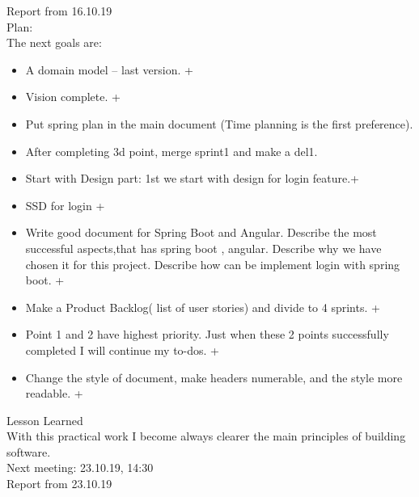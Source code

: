 \documentclass{scrartcl}
\begin{document}
Report from 16.10.19\\
Plan:\\
The next goals are:\\
\begin{itemize}


	\item	A domain model – last version. +
	\item	Vision complete. +
	\item	Put spring plan in the main document (Time planning is the first preference).
	\item	After completing 3d point, merge sprint1 and make a del1.
	\item	Start with Design part: 1st we start with design for login feature.+
	\item	SSD for login +
	\item	Write good document for Spring Boot and Angular. Describe the most successful aspects,that has spring boot , angular. Describe why we have chosen it for this project. Describe how can be implement login with spring boot.    +
	\item	Make a Product Backlog( list of user stories) and divide to 4 sprints. +
	\item	Point 1 and 2 have highest priority. Just when these 2 points successfully completed I will continue my  to-dos.  +
	\item	Change the style of document, make headers numerable, and the style more readable.  +
 \end{itemize}
Lesson Learned\\
With this practical work I become always clearer the main principles of building software.\\

Next meeting:		23.10.19, 14:30\\



Report from 23.10.19\\
\end{document}
